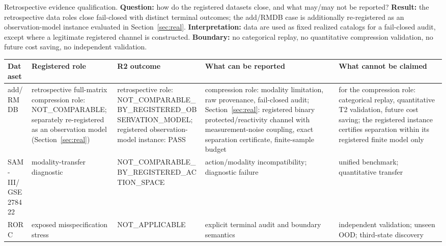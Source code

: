 \caption{Retrospective evidence qualification. \textbf{Question:} how do the registered datasets
close, and what may/may not be reported? \textbf{Result:} the retrospective data roles close fail-closed
with distinct terminal outcomes; the add/RMDB case is additionally re-registered as an observation-model
instance evaluated in Section~\ref{sec:real}. \textbf{Interpretation:} data are used as fixed realized
catalogs for a fail-closed audit, except where a legitimate registered channel is constructed.
\textbf{Boundary:} no categorical replay, no quantitative compression validation, no future cost saving,
no independent validation.}
\label{tab:retro}
\begin{tabular}{@{}p{2.0cm}p{3.2cm}p{3.4cm}p{3.2cm}p{3.2cm}@{}}
\toprule
Dataset & Registered role & R2 outcome & What can be reported & What cannot be claimed \\
\midrule
add/RMDB & retrospective full-matrix compression role: NOT\_COMPARABLE;
  separately re-registered as an observation model (Section~\ref{sec:real}) &
  retrospective role: NOT\_COMPARABLE\_BY\_REGISTERED\_OBSERVATION\_MODEL;
  registered observation-model instance: PASS &
  compression role: modality limitation, raw provenance, fail-closed audit;
  Section~\ref{sec:real}: registered binary protected/reactivity channel with
  measurement-noise coupling, exact separation certificate, finite-sample budget &
  for the compression role: categorical replay, quantitative T2 validation,
  future cost saving; the registered instance certifies separation within its
  registered finite model only \\
\addlinespace
SAM-III/GSE278422 & modality-transfer diagnostic &
  NOT\_COMPARABLE\_BY\_REGISTERED\_ACTION\_SPACE &
  action/modality incompatibility; diagnostic failure &
  unified benchmark; quantitative transfer \\
\addlinespace
RORC & exposed misspecification stress &
  NOT\_APPLICABLE &
  explicit terminal audit and boundary semantics &
  independent validation; unseen OOD; third-state discovery \\
\bottomrule
\end{tabular}

